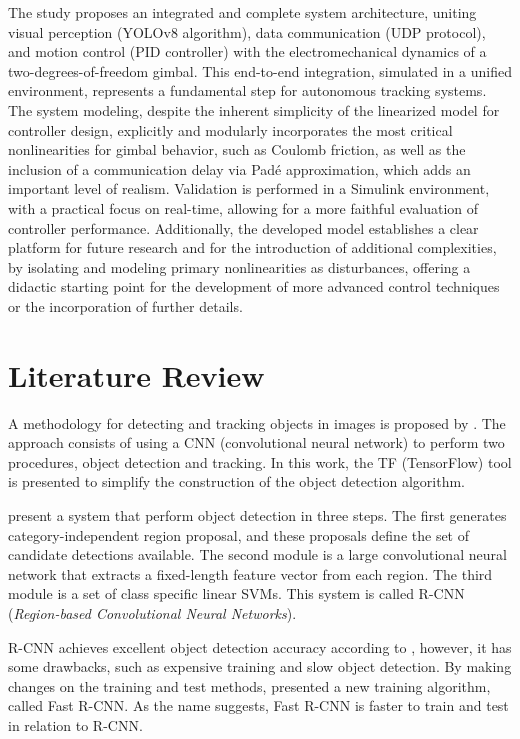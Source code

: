 The study proposes an integrated and complete system architecture, uniting visual perception (YOLOv8 algorithm), data communication (UDP protocol), and motion control (PID controller) with the electromechanical dynamics of a two-degrees-of-freedom gimbal. This end-to-end integration, simulated in a unified environment, represents a fundamental step for autonomous tracking systems. The system modeling, despite the inherent simplicity of the linearized model for controller design, explicitly and modularly incorporates the most critical nonlinearities for gimbal behavior, such as Coulomb friction, as well as the inclusion of a communication delay via Padé approximation, which adds an important level of realism. Validation is performed in a Simulink environment, with a practical focus on real-time, allowing for a more faithful evaluation of controller performance. Additionally, the developed model establishes a clear platform for future research and for the introduction of additional complexities, by isolating and modeling primary nonlinearities as disturbances, offering a didactic starting point for the development of more advanced control techniques or the incorporation of further details.

\section{Literature Review}
A methodology for detecting and tracking objects in images is proposed by . The approach consists of using a CNN (convolutional neural network) to perform two procedures, object detection and tracking. In this work, the TF (TensorFlow) tool is presented to simplify the construction of the object detection algorithm.

 present a system that perform object detection in three steps. The first generates category-independent region proposal, and these proposals define the set of candidate detections available. The second module is a large convolutional neural network that extracts a fixed-length feature vector from each region. The third module is a set of class specific linear SVMs. This system is called R-CNN (\textit{Region-based Convolutional Neural Networks}). 

R-CNN achieves excellent object detection accuracy according to , however, it has some drawbacks, such as expensive training and slow object detection. By making changes on the training and test methods,  presented a new training algorithm, called Fast R-CNN. As the name suggests, Fast R-CNN is faster to train and test in relation to R-CNN.

